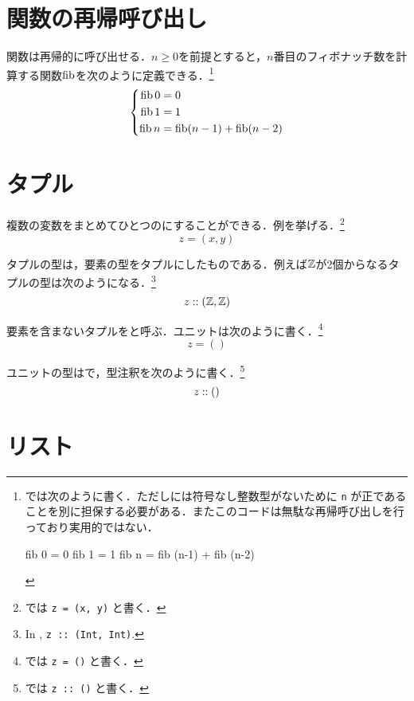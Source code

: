 \documentclass[platex,a5paper,twoside,fleqn,draft]{jsbook}
\newcommand{\keyword}[1]{\textgt{\textbf{#1}}}
\begin{document}
\section{関数の再帰呼び出し}

関数は再帰的に呼び出せる．$n\ge0$を前提とすると，$n$番目のフィボナッチ数を計算する関数$\mathop{\textrm{fib}}$を次のように定義できる．\footnote{\haskell では次のように書く．ただし\haskell には符号なし整数型がないために \verb|n| が正であることを別に担保する必要がある．またこのコードは無駄な再帰呼び出しを行っており実用的ではない．
\begin{footcode}
      fib 0 = 0
      fib 1 = 1
      fib n = fib (n-1) + fib (n-2)
\end{footcode}}
\begin{equation}
\left\{
\begin{aligned}
\mathop{\textrm{fib}} 0&=0\\
\mathop{\textrm{fib}} 1&=1\\
\mathop{\textrm{fib}} n&=\mathop{\textrm{fib}}(n-1)+\mathop{\textrm{fib}}(n-2)
\end{aligned}
\right.
\end{equation}

\section{タプル}

複数の変数をまとめてひとつの\keyword{タプル}にすることができる．例を挙げる．\footnote{\haskell では \verb|z = (x, y)| と書く．}
\begin{equation}
z=(x,y)
\end{equation}

タプルの型は，要素の型をタプルにしたものである．例えば$\mathord{\mathbb{Z}}$が2個からなるタプルの型は次のようになる．\footnote{In \haskell, \verb|z :: (Int, Int)|.}
\begin{equation}
z::(\mathord{\mathbb{Z}},\mathord{\mathbb{Z}})
\end{equation}

要素を含まないタプルを\keyword{ユニット}と呼ぶ．ユニットは次のように書く．\footnote{\haskell では \verb|z = ()| と書く．}
\begin{equation}
z=()
\end{equation}

ユニットの型は\keyword{ユニット型}で，型注釈を次のように書く．\footnote{\haskell では \verb|z :: ()| と書く．}
\begin{equation}
z::()
\end{equation}

\section{リスト}
\end{document}
